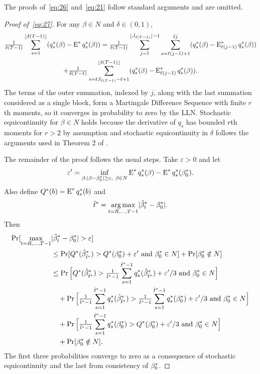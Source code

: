 \documentclass[12pt,fleqn]{article}
\begin{document}
The proofs of~\eqref{eq:26} and~\eqref{eq:21} follow standard
arguments and are omitted.

\begin{proof}[Proof of~\eqref{eq:27}]
  For any $\beta \in N$ and $\delta \in (0,1)$,
  \begin{multline}\label{eq:28}
    \tfrac{1}{\delta(T-1)} \sum_{s=1}^{\lfloor \delta(T-1) \rfloor}
    (q_s^*(\beta) - \operatorname{E}^*q_s^*(\beta))
    =  \tfrac{1}{\delta(T-1)} \sum_{j=1}^{\lfloor J_{\delta(T-1)} \rfloor - 1}
    \sum_{s=\ell (j-1) + 1}^{\ell j}
    (q_s^*(\beta) - \operatorname{E}^*_{\ell (j-1)}  q_s^*(\beta)) \\
    + \tfrac{1}{\delta(T-1)} \sum_{s=\ell J_{\delta(T-1)} - \ell + 1}^{\lfloor \delta(T-1) \rfloor}
    (q_s^*(\beta) - \operatorname{E}^*_{\ell (j-1)}  q_s^*(\beta)).
  \end{multline}
  The terms of the outer summation, indexed by $j$, along with the
  last summation considered as a single block, form a Martingale
  Difference Sequence with finite $r$th moments, so it converges in
  probability to zero by the LLN. Stochastic equicontinuity for
  $\beta \in N$ holds because the derivative of $q_s$ has bounded
  $r$th moments for $r > 2$ by assumption and stochastic
  equicontinuity in $\delta$ follows the arguments used in Theorem 2
  of \citet{Cal:14}.

  The remainder of the proof follows the usual steps. \citep[See, for
  example,][]{NeM:94} Take $\varepsilon > 0$ and let
  \[
    \varepsilon' =
    \inf_{\beta : \lvert \beta - \btrue^* \rvert \geq \varepsilon,\ \beta \in N}
    \E^* q_s^*(\beta) - \E^* q_s^*(\btrue^*).
  \]
  Also define $Q^*(b) = \operatorname{E}^* q_s^*(b)$ and
  \[
    \hat t^* = \operatorname*{arg\,max}_{t=R,\dots,T-1} \lvert \hat \beta_t^* - \beta_0^* \rvert.
  \]
  Then
  \begin{align*}
    \operatorname{Pr}[ \max_{t=R,\dots,T-1} &\lvert \hat \beta_t^* - \beta_0^* \rvert > \varepsilon ] \\
    &\leq \operatorname{Pr}[ Q^*(\hat \beta_{\hat t^*}^*) > Q^*(\beta_0^*) + \varepsilon'
      \text{\ and\ } \beta_0^* \in N] + \operatorname{Pr}[\beta_0^* \notin N] \\
    &\leq \operatorname{Pr}\Big[ Q^*(\hat \beta_{\hat t^*}^*) >
     \tfrac{1}{\hat t^*-1} \sum_{s=1}^{\hat t^*-1} q_s^*(\hat \beta_{\hat t^*}^*) + \varepsilon'/3
     \text{\ and\ } \beta_0^* \in N\Big] \\
    &\quad+ \operatorname{Pr}\Big[ \tfrac{1}{\hat t^*-1} \sum_{s=1}^{\hat t^*-1} q_s^*(\hat \beta_{\hat t^*}^*) >
      \tfrac{1}{\hat t^*-1} \sum_{s=1}^{\hat t^*-1} q_s^*(\beta_0^*) + \varepsilon'/3
      \text{\ and\ } \beta_0^* \in N\Big] \\
    &\quad+ \operatorname{Pr}\Big[\tfrac{1}{\hat t^*-1} \sum_{s=1}^{\hat t^*-1} q_s^*(\beta_0^*) >
      Q^*(\beta_0^*) + \varepsilon'/3 \text{\ and\ } \beta_0^* \in N\Big] \\
    &\quad+ \operatorname{Pr}[\beta_0^* \notin N].
  \end{align*}
  The first three probabilities converge to zero as a consequence of
  stochastic equicontinuity and the last from consistency of
  $\beta_0^*$.
\end{proof}
\end{document}
